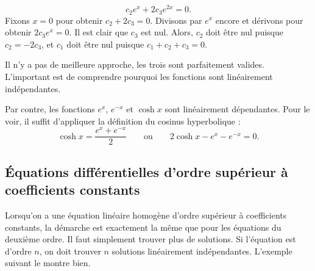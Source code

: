 \begin{example}
	\begin{equation*}
		c_2 e^{x} + 2 c_3 e^{2x} = 0 .
	\end{equation*}
	Fixons  $x=0$ pour obtenir $c_2 + 2c_3 = 0$.  
	Divisons par $e^x$ encore et dérivons pour obtenir $2 c_3 e^{x} = 0$.  Il est clair que   $c_3$ est nul.  
	Alors, $c_2$ doit être nul puisque $c_2 = -2c_3$, et $c_1$ doit être nul puisque $c_1 + c_2 + c_3 = 0$.
	
	Il n'y a pas de meilleure approche, les trois sont parfaitement valides. L'important est de comprendre pourquoi les fonctions sont linéairement indépendantes. 
\end{example}
	
\begin{example}
	Par contre, les fonctions  $e^x$, $e^{-x}$ et $\cosh x$ sont linéairement dépendantes.  
	Pour le voir, il suffit d'appliquer la définition du cosinus hyperbolique : 
	\begin{equation*}
		\cosh x = \frac{e^x + e^{-x}}{2} 	\qquad	\text{ou}	\qquad	2 \cosh x - e^x - e^{-x} = 0.
	\end{equation*}
\end{example}

\subsection[EDO d'ordre supérieur à coefficients constants]{Équations différentielles d'ordre supérieur à coefficients constants}

Lorsqu'on a une équation linéaire homogène d'ordre supérieur à coefficients constants, la démarche est exactement la même que pour les équations du deuxième ordre. Il faut simplement trouver plus de solutions. 
Si l'équation est d'ordre $n$, on doit trouver $n$ solutions linéairement indépendantes.
L'exemple suivant le montre bien.

